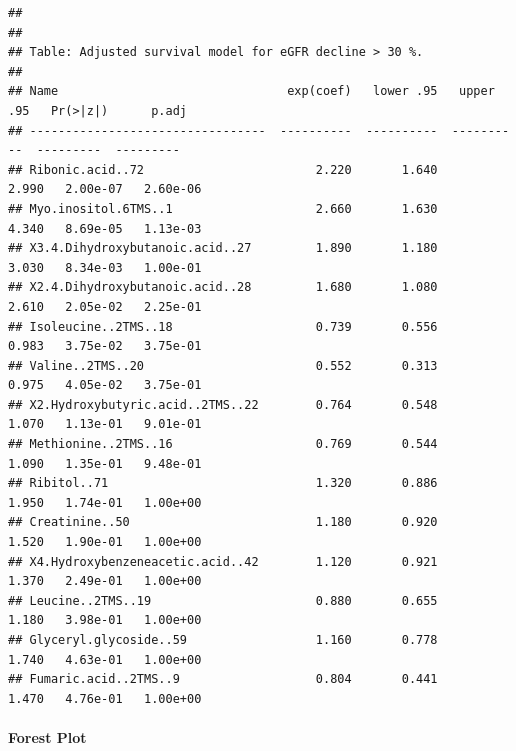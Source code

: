 \documentclass[]{article}
\let\oldparagraph\paragraph
\renewcommand{\paragraph}[1]{\oldparagraph{#1}\mbox{}}
\begin{document}
\begin{verbatim}
## 
## 
## Table: Adjusted survival model for eGFR decline > 30 %.
## 
## Name                                exp(coef)   lower .95   upper .95   Pr(>|z|)      p.adj
## ---------------------------------  ----------  ----------  ----------  ---------  ---------
## Ribonic.acid..72                        2.220       1.640       2.990   2.00e-07   2.60e-06
## Myo.inositol.6TMS..1                    2.660       1.630       4.340   8.69e-05   1.13e-03
## X3.4.Dihydroxybutanoic.acid..27         1.890       1.180       3.030   8.34e-03   1.00e-01
## X2.4.Dihydroxybutanoic.acid..28         1.680       1.080       2.610   2.05e-02   2.25e-01
## Isoleucine..2TMS..18                    0.739       0.556       0.983   3.75e-02   3.75e-01
## Valine..2TMS..20                        0.552       0.313       0.975   4.05e-02   3.75e-01
## X2.Hydroxybutyric.acid..2TMS..22        0.764       0.548       1.070   1.13e-01   9.01e-01
## Methionine..2TMS..16                    0.769       0.544       1.090   1.35e-01   9.48e-01
## Ribitol..71                             1.320       0.886       1.950   1.74e-01   1.00e+00
## Creatinine..50                          1.180       0.920       1.520   1.90e-01   1.00e+00
## X4.Hydroxybenzeneacetic.acid..42        1.120       0.921       1.370   2.49e-01   1.00e+00
## Leucine..2TMS..19                       0.880       0.655       1.180   3.98e-01   1.00e+00
## Glyceryl.glycoside..59                  1.160       0.778       1.740   4.63e-01   1.00e+00
## Fumaric.acid..2TMS..9                   0.804       0.441       1.470   4.76e-01   1.00e+00
\end{verbatim}

\newpage

\hypertarget{forest-plot-5}{%
\paragraph{Forest Plot}\label{forest-plot-5}}
\end{document}
